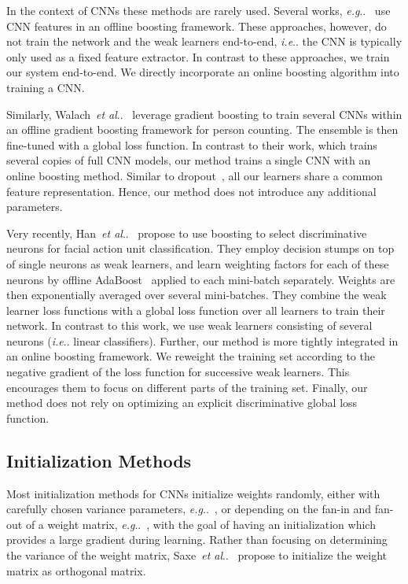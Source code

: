 \documentclass[10pt,journal,compsoc]{IEEEtran}
\makeatletter
\DeclareRobustCommand\onedot{\futurelet\@let@token\@onedot}
\def\@onedot{\ifx\@let@token.\else.\null\fi\xspace}
\def\eg{\emph{e.g}\onedot} \def\Eg{\emph{E.g}\onedot}
\def\ie{\emph{i.e}\onedot} \def\Ie{\emph{I.e}\onedot}
\def\etal{\emph{et al}\onedot}
\makeatother
\begin{document}
In the context of \acp{CNN} these methods are rarely
used. Several works, \eg~\cite{karianakis2015boosting, yang2015convolutional}
use \ac{CNN} features in an offline boosting framework. These approaches,
however, do not train the network and the weak learners end-to-end, \ie the
\ac{CNN} is typically only used as a fixed feature extractor. In contrast to these approaches, we train our system end-to-end. 
We directly incorporate an online boosting algorithm into training a \ac{CNN}.

Similarly, Walach~\etal~\cite{walach2016learning} leverage gradient boosting to train several \acp{CNN} within an offline gradient boosting framework for person counting. 
The ensemble is then fine-tuned with a global loss function. In contrast to their work, which trains several copies of full \ac{CNN} models, 
our method trains a single \ac{CNN} with an online boosting method. Similar to dropout~\cite{srivastava14dropout}, all our learners share a common feature representation. Hence, 
our method does not introduce any additional parameters. 

Very recently, Han~\etal~\cite{han2016actionunit} propose to use boosting to select
discriminative neurons for facial action unit classification. They employ
decision stumps on top of single neurons as weak learners, and learn weighting
factors for each of these neurons by offline AdaBoost~\cite{freund1997boost} applied to each
mini-batch separately. Weights are then exponentially averaged over several
mini-batches. They combine the weak learner loss functions with a global loss
function over all learners to train their network. In contrast to this work, we
use weak learners consisting of several neurons (\ie linear classifiers).
Further, our method is more tightly integrated in an online boosting
framework.  We reweight the training set according to the negative gradient of
the loss function for successive weak learners.  This encourages them to focus
on different parts of the training set. Finally, our method does not rely on
optimizing an explicit discriminative global loss function. 

\subsection{Initialization Methods}\label{sec:related-work-init}

Most initialization methods for \acp{CNN} initialize weights randomly, either
with carefully chosen variance parameters, \eg~\cite{krizhevsky2012imagenet}, or depending
on the fan-in and fan-out of a weight matrix, \eg~\cite{Glorot10, He2015}, with the goal of having an 
initialization which provides a large gradient during learning.
Rather than focusing on determining the variance of the weight matrix, Saxe~\etal~\cite{SaxeMG13}
propose to initialize the weight matrix as orthogonal matrix.
\end{document}
